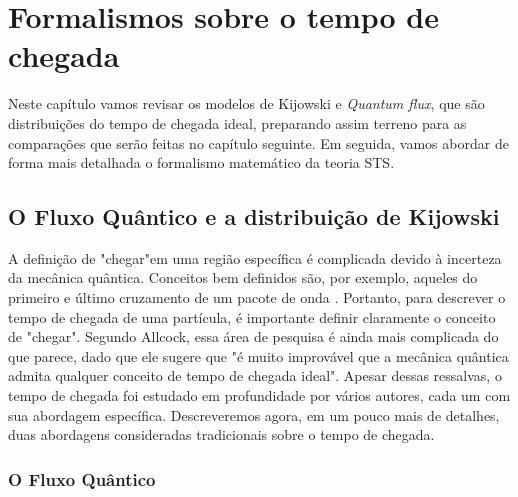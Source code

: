 \chapter{Formalismos sobre o tempo de chegada}
\label{chap:cap2}

Neste capítulo vamos revisar os modelos de Kijowski e \textit{Quantum flux}, que são distribuições do tempo de chegada ideal, preparando assim terreno para as comparações que serão feitas no capítulo seguinte. Em seguida, vamos abordar de forma mais detalhada o formalismo matemático da teoria STS.  

%



\section{O Fluxo Quântico e a distribuição de Kijowski}
\label{sec:cap2intro}

A definição de "chegar"\text{ }em uma região específica é complicada devido à incerteza da mecânica quântica. Conceitos bem definidos são, por exemplo, aqueles do primeiro e último cruzamento de um pacote de onda \cite{14}. Portanto, para descrever o tempo de chegada de uma partícula, é importante definir claramente o conceito de "chegar". Segundo Allcock, essa área de pesquisa é ainda mais complicada do que parece, dado que ele sugere que "é muito improvável que a mecânica quântica admita qualquer conceito de tempo de chegada ideal"\text{ }\cite{allcock}. Apesar dessas ressalvas, o tempo de chegada foi estudado em profundidade por vários autores, cada um com sua abordagem específica. Descreveremos agora, em um pouco mais de detalhes, duas abordagens consideradas tradicionais sobre o tempo de chegada.




\subsection{O Fluxo Quântico}
\label{sub:fluxoquantico}


